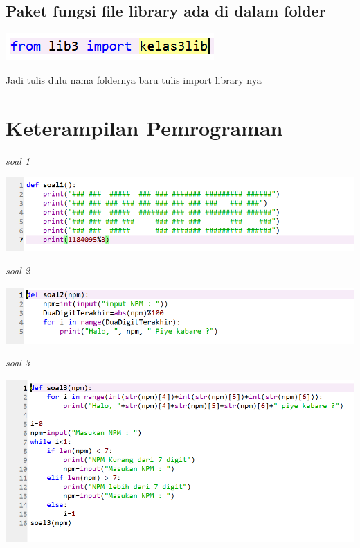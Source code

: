 \documentclass{article}
\begin{document}
\subsection{Paket fungsi ﬁle library ada di dalam folder}
\begin{center}
    \includegraphics[width=6cm\textwidth]{figure/folder.png}
\end{center}
Jadi tulis dulu nama foldernya baru tulis import library nya\\


\section{Keterampilan Pemrograman}
\textit{soal 1}
\begin{center}
    \includegraphics[width=15cm\textwidth]{figure/1.png}
\end{center}

\textit{soal 2}
\begin{center}
    \includegraphics[width=15cm\textwidth]{figure/2.png}
\end{center}

\textit{soal 3}
\begin{center}
    \includegraphics[width=15cm\textwidth]{figure/3.png}
\end{center}
\end{document}
